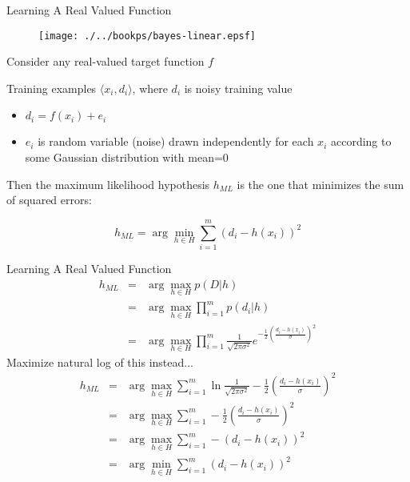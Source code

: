 \documentclass[%
pdf,
colorBG,
slideColor,
tcrico,
]{prosper}
\begin{document}
\begin{slide}{ Learning A Real Valued Function} 

\begin{figure}
	\centering
	\texttt{[image: ./../bookps/bayes-linear.epsf]}
\end{figure}
\tiny

Consider any real-valued target function $f$

Training examples $\langle x_{i}, d_{i} \rangle$, where $d_{i}$ is noisy
training value
\begin{itemize} \item $d_{i} = f(x_{i}) + e_{i}$ 
\item $e_{i}$ is random variable (noise) drawn independently for each $x_{i}$ 
according to some Gaussian distribution with mean=0
\end{itemize}

Then the maximum likelihood hypothesis $h_{ML}$ is the one that minimizes
the sum of squared errors:

\[ h_{ML} = \arg \min_{h \in H} \sum_{i=1}^{m} \left(d_{i} -
h(x_{i})\right)^{2} \]
\end{slide}


\begin{slide}{ Learning A Real Valued Function   }  
\tiny 
\begin{eqnarray}
h_{ML} &= &\arg\max_{h \in H} p(D|h) \nonumber \\
 &= &\arg\max_{h \in H} \prod_{i=1}^{m} p(d_{i}|h) \nonumber \\
&= &\arg\max_{h \in H} \prod_{i=1}^{m} \frac{1}{\sqrt{2 \pi \sigma^{2}}}
e^{-\frac{1}{2}(\frac{d_{i} - h(x_{i})}{\sigma})^{2}} \nonumber
\end{eqnarray}
Maximize natural log of this instead...
\begin{eqnarray}
h_{ML}  &= &\arg\max_{h \in H}
\sum_{i=1}^{m} \ln \frac{1}{\sqrt{2 \pi \sigma^{2}}} -
\frac{1}{2}\left(\frac{d_{i} - h(x_{i})}{\sigma}\right)^{2} \nonumber \\
  &= &\arg\max_{h \in H} \sum_{i=1}^{m} -
\frac{1}{2}\left(\frac{d_{i} - h(x_{i})}{\sigma}\right)^{2} \nonumber \\
 &= &\arg\max_{h \in H} \sum_{i=1}^{m} - \left(d_{i} - h(x_{i})\right)^{2}
 \nonumber \\
 &= &\arg\min_{h \in H} \sum_{i=1}^{m} \left(d_{i} - h(x_{i})\right)^{2}  \nonumber
\end{eqnarray}
\end{slide}
\end{document}

